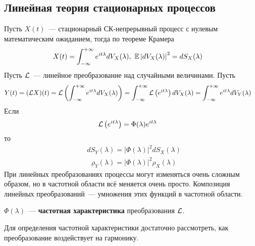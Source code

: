 \subsection{Линейная теория стационарных процессов}
Пусть $X(t)$~--- стационарный СК-непрерывный процесс с нулевым математическим
ожиданием, тогда по теореме Крамера
\begin{align*}
  & X(t) = \int_{-\infty}^{+\infty}e^{it\lambda} dV_X(\lambda), \ \EE \left| dV_X(\lambda) \right|^2 = dS_X(\lambda)
\end{align*}
Пусть $\mathcal{L}$~--- линейное преобразование над случайными величинами. Пусть
\begin{align*}
  & Y(t) = (\mathcal{L} X)(t) = \mathcal{L}\left( \int_{-\infty}^{+\infty}e^{it\lambda} dV_X(\lambda)\right) = \int_{-\infty}^{+\infty}\mathcal{L}\left( e^{it\lambda}\right) dV_X(\lambda) = \int_{-\infty}^{+\infty} e^{it\lambda} dV_Y(\lambda)
\end{align*}
Если 
\begin{align*}
  & \mathcal{L}\left( e^{it\lambda}\right) = \Phi(\lambda)e^{it\lambda}
\end{align*}
то
\begin{align*}
  & dS_Y(\lambda) = \left| \Phi(\lambda) \right|^2 dS_X(\lambda)
\end{align*}
\begin{align*}
  & \rho_Y(\lambda) = \left| \Phi(\lambda) \right|^2 \rho_X(\lambda)
\end{align*}
При линейных преобразованиях процессы могут изменяться очень сложным образом, но
в частотной области всё меняется очень просто. Композиция линейных
преобразований~--- умножения этих функций в частотной области.
\begin{Def}
    $\Phi(\lambda)$~--- \textbf{частотная характеристика} преобразования $\mathcal{L}$.
\end{Def}
Для определения частотной характеристики достаточно рассмотреть, как
преобразование воздействует на гармонику.
\\
